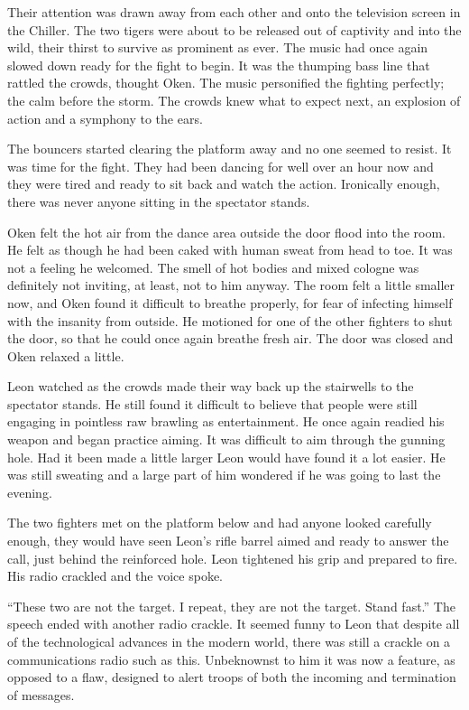 Their attention was drawn away from each other and onto the television screen in the Chiller.  The two tigers were about to be released out of captivity and into the wild, their thirst to survive as prominent as ever.  The music had once again slowed down ready for the fight to begin.  It was the thumping bass line that rattled the crowds, thought Oken.  The music personified the fighting perfectly; the calm before the storm.  The crowds knew what to expect next, an explosion of action and a symphony to the ears.  

The bouncers started clearing the platform away and no one seemed to resist.  It was time for the fight.  They had been dancing for well over an hour now and they were tired and ready to sit back and watch the action.  Ironically enough, there was never anyone sitting in the spectator stands.  

Oken felt the hot air from the dance area outside the door flood into the room.  He felt as though he had been caked with human sweat from head to toe.  It was not a feeling he welcomed.  The smell of hot bodies and mixed cologne was definitely not inviting, at least, not to him anyway.  The room felt a little smaller now, and Oken found it difficult to breathe properly, for fear of infecting himself with the insanity from outside.  He motioned for one of the other fighters to shut the door, so that he could once again breathe fresh air.  The door was closed and Oken relaxed a little.



\thoughtbreak



Leon watched as the crowds made their way back up the stairwells to the spectator stands.  He still found it difficult to believe that people were still engaging in pointless raw brawling as entertainment.  He once again readied his weapon and began practice aiming.  It was  difficult to aim through the gunning hole.  Had it been made a little larger Leon would have found it a lot easier.  He was still sweating and a large part of him wondered if he was going to last the evening.

The two fighters met on the platform below and had anyone looked carefully enough, they would have seen Leon's rifle barrel aimed and ready to answer the call, just behind the reinforced hole.  Leon tightened his grip and prepared to fire.  His radio crackled and the voice spoke.

``These two are not the target.  I repeat, they are not the target.  Stand fast.''  The speech ended with another radio crackle.  It seemed funny to Leon that despite all of the technological advances in the modern world, there was still a crackle on a communications radio such as this.  Unbeknownst to him it was now a feature, as opposed to a flaw, designed to alert troops of both the incoming and termination of messages.

